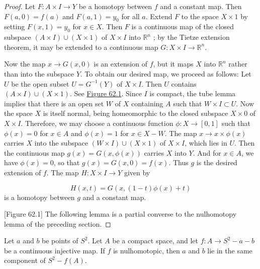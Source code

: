 \begin{proof}
Let \(F : A \times I \rightarrow Y\) be a homotopy between \(f\) and a constant map. Then \(F( {a,0}) = f( a)\) and \(F( {a,1}) = y_{0}\) for all \(a\). Extend \(F\) to the space \(X \times 1\) by setting \(F( {x,1}) = y_{0}\) for \(x \in X\). Then \(F\) is a continuous map of the closed subspace \((A \times I) \cup ( {X \times 1})\) of \(X \times I\) into \(\mathbb{R}^{n}\) ; by the Tietze extension theorem, it may be extended to a continuous map \(G : X \times I \rightarrow {\mathbb{R}}^{n}\).

Now the map \(x \rightarrow G( {x,0})\) is an extension of \(f\), but it maps \(X\) into \(\mathbb{R}^{n}\) rather than into the subspace \(Y\). To obtain our desired map, we proceed as follows: Let \(U\) be the open subset \(U = G^{-1}( Y)\) of \(X \times I\). Then \(U\) contains \(( {A \times I}) \cup ( {X \times 1})\). See \hyperref[fig:62.1]{Figure 62.1}. Since \(I\) is compact, the tube lemma implies that there is an open set \(W\) of \(X\) containing \(A\) such that \(W \times I \subset U\). Now the space \(X\) is itself normal, being homeomorphic to the closed subspace \(X \times 0\) of \(X \times I\). Therefore, we may choose a continuous function \(\phi : X \rightarrow [ {0,1}]\) such that \(\phi (x) = 0\) for \(x \in A\) and \(\phi (x) = 1\) for \(x \in X - W\). The map \(x \rightarrow x \times \phi (x)\) carries \(X\) into the subspace \(( {W \times I}) \cup ( {X \times 1})\) of \(X \times I\), which lies in \(U\). Then the continuous map \(g(x) = G( {x,\phi (x) })\) carries \(X\) into \(Y\). And for \(x \in A\), we have \(\phi (x) = 0\), so that \(g(x) = G( {x,0}) = f(x)\). Thus \(g\) is the desired extension of \(f\). The map \(H : X \times I \rightarrow Y\) given by

\[
H( {x,t}) = G( {x,( {1 - t}) \phi (x) + t})
\]
is a homotopy between \(g\) and a constant map.

[Figure 62.1]
The following lemma is a partial converse to the nulhomotopy lemma of the preceding section.
\end{proof}
\begin{lemma}
\label{lem:\thetheorem}
Let \(a\) and \(b\) be points of \(S^{2}\). Let \(A\) be a compact space, and let \(f : A \rightarrow {S}^{2} - a - b\) be a continuous injective map. If \(f\) is nulhomotopic, then \(a\) and \(b\) lie in the same component of \(S^{2} - f( A)\).
\end{lemma}

